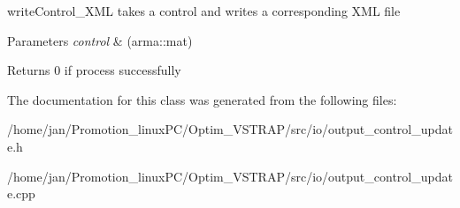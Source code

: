 write\+Control\+\_\+\+X\+ML takes a control and writes a corresponding X\+ML file 


\begin{DoxyParams}{Parameters}
{\em control} & (arma\+::mat) \\
\hline
\end{DoxyParams}
\begin{DoxyReturn}{Returns}
0 if process successfully 
\end{DoxyReturn}


The documentation for this class was generated from the following files\+:\begin{DoxyCompactItemize}
\item 
/home/jan/\+Promotion\+\_\+linux\+P\+C/\+Optim\+\_\+\+V\+S\+T\+R\+A\+P/src/io/output\+\_\+control\+\_\+update.\+h\item 
/home/jan/\+Promotion\+\_\+linux\+P\+C/\+Optim\+\_\+\+V\+S\+T\+R\+A\+P/src/io/output\+\_\+control\+\_\+update.\+cpp\end{DoxyCompactItemize}
